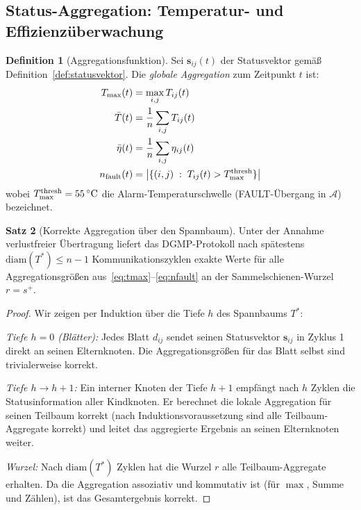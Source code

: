 ﻿\documentclass[a4paper,12pt]{article}
\theoremstyle{definition}
\newtheorem{definition}{Definition}[section]
\newtheorem{satz}[definition]{Satz}
\theoremstyle{remark}
\begin{document}
\subsection{Status-Aggregation: Temperatur- und Effizienzüberwachung}
\label{sec:komm_aggregation}

\begin{definition}[Aggregationsfunktion]
\label{def:aggregation}
Sei $\mathbf{s}_{ij}(t)$ der Statusvektor gemäß Definition~\ref{def:statusvektor}.
Die \emph{globale Aggregation} zum Zeitpunkt $t$ ist:
\begin{align}
  T_{\max}(t)   &= \max_{i,j} T_{ij}(t)          \label{eq:tmax}\\
  \bar{T}(t)    &= \frac{1}{n}\sum_{i,j} T_{ij}(t) \label{eq:tmean}\\
  \bar{\eta}(t) &= \frac{1}{n}\sum_{i,j} \eta_{ij}(t) \label{eq:etamean}\\
  n_{\rm fault}(t) &= \bigl|\{(i,j)\;:\; T_{ij}(t) > T_{\max}^{\rm thresh}\}\bigr|
  \label{eq:nfault}
\end{align}
wobei $T_{\max}^{\rm thresh} = 55\,^{\circ}\mathrm{C}$ die Alarm-Temperaturschwelle
(FAULT-Übergang in $\mathcal{A}$) bezeichnet.
\end{definition}

\begin{satz}[Korrekte Aggregation über den Spannbaum]
\label{satz:aggregation}
Unter der Annahme verlustfreier Übertragung liefert das DGMP-Protokoll
nach spätestens $\mathrm{diam}(T^*) \leq n-1$ Kommunikationszyklen
exakte Werte für alle Aggregationsgrößen aus~\eqref{eq:tmax}--\eqref{eq:nfault}
an der Sammelschie\-nen-Wurzel $r = s^+$.
\end{satz}

\begin{proof}
Wir zeigen per Induktion über die Tiefe $h$ des Spannbaums $T^*$:

\emph{Tiefe $h=0$ (Blätter):} Jedes Blatt $d_{ij}$ sendet seinen
Statusvektor $\mathbf{s}_{ij}$ in Zyklus 1 direkt an seinen Elternknoten.
Die Aggregationsgrößen für das Blatt selbst sind trivialerweise korrekt.

\emph{Tiefe $h \to h+1$:} Ein interner Knoten der Tiefe $h+1$ empfängt nach
$h$ Zyklen die Statusinformation aller Kindknoten. Er berechnet die lokale
Aggregation für seinen Teilbaum korrekt (nach Induktionsvoraussetzung sind
alle Teilbaum-Aggregate korrekt) und leitet das aggregierte Ergebnis an
seinen Elternknoten weiter.

\emph{Wurzel:} Nach $\mathrm{diam}(T^*)$ Zyklen hat die Wurzel $r$ alle
Teilbaum-Aggregate erhalten. Da die Aggregation assoziativ und kommutativ ist
(für $\max$, Summe und Zählen), ist das Gesamtergebnis korrekt.
\qedhere
\end{proof}
\end{document}
